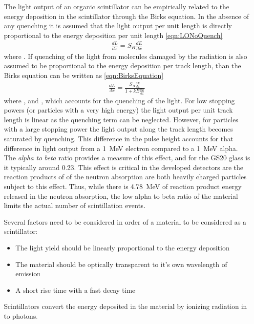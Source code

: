The light output of an organic scintillator can be empirically related to the energy deposition in the scintillator through the Birks equation.
In the absence of any quenching it is assumed that the light output per unit length is directly proportional to the energy deposition per unit length \eqref{eqn:LONoQuench}
\begin{align}
  \label{eqn:LONoQuench}
    \frac{dL}{dx} = S_B\frac{dE}{dx}
\end{align}
where .
If quenching of the light from molecules damaged by the radiation is also assumed to be proportional to the energy deposition per track length, than the Birks equation can be written as \eqref{eqn:BirksEquation}
\begin{align}
  \label{eqn:BirksEquation}
    \frac{dL}{dx} = \frac{S_B\frac{dE}{dx}}{1+kB\frac{dE}{dx}}
    \end{align}
    where , and , which accounts for the quenching of the light.
For low stopping powers (or particles with a very high energy) the light output per unit track length is linear as the quenching term can be neglected.
However, for particles with a large stopping power the light output along the track length becomes saturated by quenching.
This difference in the pulse height accounts for that difference in light output from a \SI{1}{\MeV} electron compared to a \SI{1}{\MeV} alpha.
The \textit{alpha to beta} ratio provides a measure of this effect, and for the GS20 glass is it typically around 0.23.
This effect is critical in the developed detectors are the reaction products of of the  neutron absorption are both heavily charged particles subject to this effect.
Thus, while there is \SI{4.78}{\MeV} of reaction product energy released in the neutron absorption, the low alpha to beta ratio of the material limits the actual number of scintillation events.


Several factors need to be considered in order of a material to be considered as a scintillator:
\begin{itemize}
  \item The light yield should be linearly proportional to the energy deposition
  \item The material should be optically transparent to it's own wavelength of emission
  \item A short rise time with a fast decay time
\end{itemize}
Scintillators convert the energy deposited in the material by ionizing radiation in to photons.


